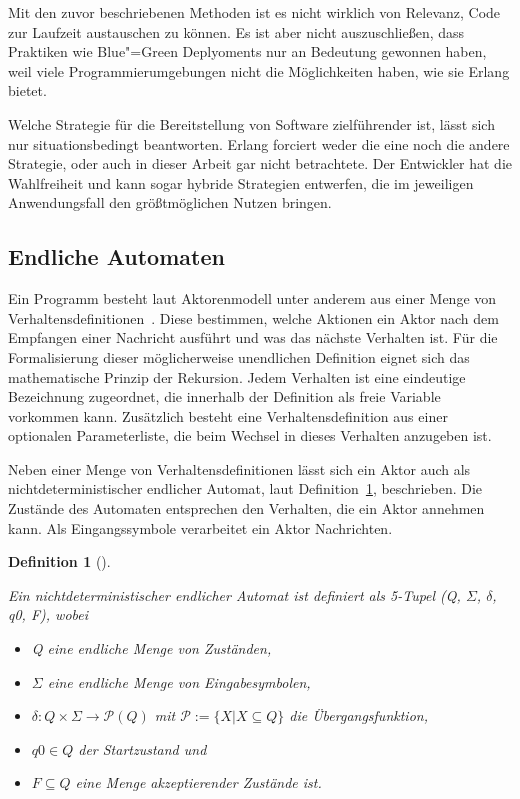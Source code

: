Mit den zuvor beschriebenen Methoden ist es nicht wirklich von Relevanz, Code zur Laufzeit austauschen zu können. Es ist aber nicht auszuschließen, dass Praktiken wie Blue"=Green Deplyoments \usw nur an Bedeutung gewonnen haben, weil viele Programmierumgebungen nicht die Möglichkeiten haben, wie sie Erlang bietet.

Welche Strategie für die Bereitstellung von Software zielführender ist, lässt sich nur situationsbedingt beantworten. Erlang forciert weder die eine noch die andere Strategie, oder auch in dieser Arbeit gar nicht betrachtete. Der Entwickler hat die Wahlfreiheit und kann sogar hybride Strategien entwerfen, die im jeweiligen Anwendungsfall den größtmöglichen Nutzen bringen.

\subsection{Endliche Automaten}

Ein Programm besteht laut Aktorenmodell unter anderem aus einer Menge von Verhaltensdefinitionen~\cite[30]{Agha:1986:AMC:7929}. Diese bestimmen, welche Aktionen ein Aktor nach dem Empfangen einer Nachricht ausführt und was das nächste Verhalten ist. Für die Formalisierung dieser möglicherweise unendlichen Definition eignet sich das mathematische Prinzip der Rekursion. Jedem Verhalten ist eine eindeutige Bezeichnung zugeordnet, die innerhalb der Definition als freie Variable vorkommen kann. Zusätzlich besteht eine Verhaltensdefinition aus einer optionalen Parameterliste, die beim Wechsel in dieses Verhalten anzugeben ist.

Neben einer Menge von Verhaltensdefinitionen lässt sich ein Aktor auch als nichtdeterministischer endlicher Automat, laut Definition~\ref{def:nfs}, beschrieben. Die Zustände des Automaten entsprechen den Verhalten, die ein Aktor annehmen kann. Als Eingangssymbole verarbeitet ein Aktor Nachrichten.

\newtheorem{nfstheorem}{Definition}[section]

\begin{nfstheorem}[{{\cite[87]{hopcroft2003}}}]
\label{def:nfs}

Ein nichtdeterministischer endlicher Automat ist definiert als 5-Tupel (Q, $\Sigma$, $\delta$, q0, F), wobei

\begin{itemize}
	\item Q eine endliche Menge von Zuständen,
	\item $\Sigma$ eine endliche Menge von Eingabesymbolen,
	\item $\delta : Q \times \Sigma \rightarrow \mathcal{P}(Q)$ mit $\mathcal{P} := \{ X | X \subseteq Q \}$ die Übergangsfunktion,
	\item $q0 \in Q$ der Startzustand und
	\item $F \subseteq Q$ eine Menge akzeptierender Zustände ist.
\end{itemize}

\end{nfstheorem}

